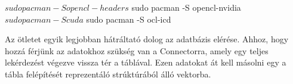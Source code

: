 \begin{python}
$ sudo pacman -S opencl-headers
$ sudo pacman -S opencl-nvidia
$ sudo pacman -S cuda
$ sudo pacman -S ocl-icd
\end{python}




Az ötletet egyik legjobban hátráltató dolog az adatbázis elérése. Ahhoz, hogy hozzá férjünk az adatokhoz szükség van a Connectorra, amely egy teljes lekérdezést végezve vissza tér a táblával. Ezen adatokat át kell másolni egy a tábla felépítését reprezentáló strúktúrából álló vektorba.



